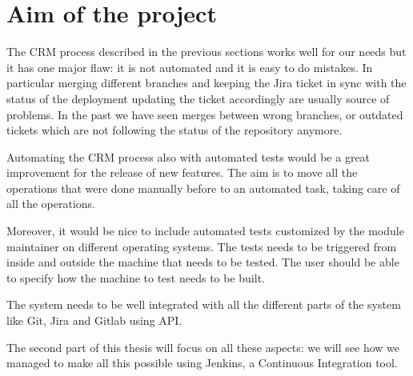 \section{Aim of the project}

The CRM process described in the previous sections works well for our
needs but it has one major flaw: it is not automated and it is easy to do
mistakes. In particular merging different branches and keeping the Jira
ticket in sync with the status of the deployment updating the ticket
accordingly are usually source of problems. In the past we have seen
merges between wrong branches, or outdated tickets which are not following
the status of the repository anymore.

Automating the CRM process also with automated tests would be a great
improvement for the release of new features. The aim is to move all the
operations that were done manually before to an automated task, taking
care of all the operations.

Moreover, it would be nice to include automated tests customized by the
module maintainer on different operating systems. The tests needs to be
triggered from inside and outside the machine that needs to be tested. The
user should be able to specify how the machine to test needs to be built.

The system needs to be well integrated with all the different parts of the
system like Git, Jira and Gitlab using API.

The second part of this thesis will focus on all these aspects: we will
see how we managed to make all this possible using Jenkins, a Continuous
Integration tool.
